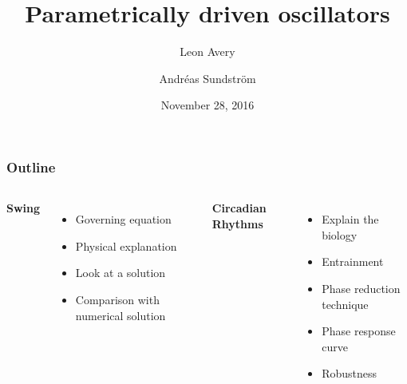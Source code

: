 \documentclass[swedish, english]{beamer}
\title[Swings and Biorhythms]{Parametrically driven oscillators}
\subtitle{} %
\author{Leon Avery \and Andréas Sundström} %
\institute[UW]{University of Waterloo}
\date{November 28, 2016}
\begin{document}
\begin{frame}[plain]
\linethickness{0.075mm}
  \titlepage
\end{frame}










\begin{frame}
\frametitle{Outline}

\begin{columns}[c]
\textbf{Swing}
\begin{itemize}
\item Governing equation
\item Physical explanation
\item Look at a solution
\item Comparison with numerical solution
\end{itemize}


\textbf{Circadian Rhythms}
\begin{itemize}
\item Explain the biology
\item Entrainment
\item Phase reduction technique
\item Phase response curve
\item Robustness
\end{itemize}

\end{columns}
\end{frame}
\end{document}
